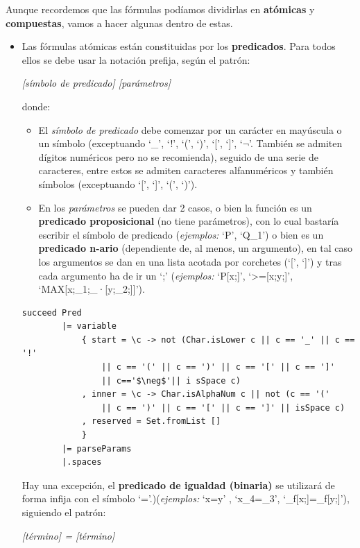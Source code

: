 \documentclass[a4paper]{report}
\begin{document}
Aunque recordemos que las fórmulas podíamos dividirlas en \textbf{atómicas} y \textbf{compuestas}, vamos a hacer algunas dentro de estas.
\begin{itemize}
\item Las fórmulas atómicas están constituidas por los \textbf{predicados}. Para todos ellos se debe usar la notación prefija, según el patrón:

\begin{center}
\textit{[símbolo de predicado] [parámetros]}
\end{center}

donde:
\begin{itemize}
\item El \textit{símbolo de predicado} debe comenzar por un carácter en mayúscula o un símbolo (exceptuando `\_',  `!', `(', `)', `[', `]', `$\neg$'. También se admiten dígitos numéricos pero no se recomienda), seguido de una serie de caracteres, entre estos se admiten caracteres alfanuméricos y también símbolos (exceptuando `[', `]', `(', `)'). 
\item En los \textit{parámetros} se pueden dar 2 casos, o bien la función es un \textbf{predicado proposicional} (no tiene parámetros), con lo cual bastaría escribir el símbolo de predicado (\textit{ejemplos:} `P', `Q\_1') o bien es un \textbf{predicado n-ario} (dependiente de, al menos, un argumento), en tal caso los argumentos se dan en una lista acotada por corchetes (`[', `]') y tras cada argumento ha de ir un `;' (\textit{ejemplos:} `P[x;]', `>=[x;y;]', `MAX[x;\_1;\_·[y;\_2;]]').\\
\end{itemize}

\begin{lstlisting}[caption={ParserLPO. Definición de Predicados.}, mathescape=true]
succeed Pred
        |= variable
            { start = \c -> not (Char.isLower c || c == '_' || c == '!' 
                || c == '(' || c == ')' || c == '[' || c == ']' 
                || c=='$\neg$'|| i sSpace c)
            , inner = \c -> Char.isAlphaNum c || not (c == '(' 
                || c == ')' || c == '[' || c == ']' || isSpace c)
            , reserved = Set.fromList []
            }
        |= parseParams
        |.spaces 
\end{lstlisting}
Hay una excepción, el \textbf{predicado de igualdad (binaria)} se utilizará de forma infija con el símbolo `='.)(\textit{ejemplos:} `x=y' , `x\_4=\_3', `\_f[x;]=\_f[y;]'), siguiendo el patrón:

\begin{center}
\textit{[término] = [término]}\\
\end{center}


\end{itemize}
\end{document}
